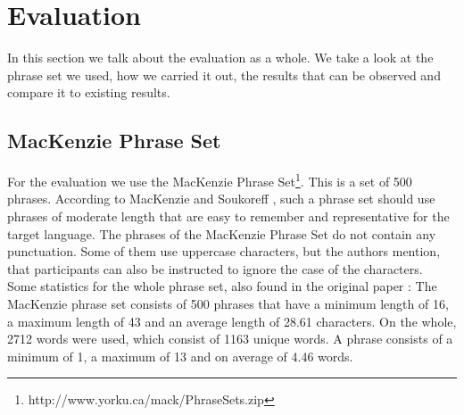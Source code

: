 \chapter{Evaluation}

In this section we talk about the evaluation as a whole. We take a look at the phrase set we used, how we carried it out, the results that can be observed and compare it to existing results.

\section{MacKenzie Phrase Set}
For the evaluation we use the MacKenzie Phrase Set\footnote{http://www.yorku.ca/mack/PhraseSets.zip}. This is a set of 500 phrases. According to MacKenzie and Soukoreff \cite{10.1145/765891.765971}, such a phrase set should use phrases of moderate length that are easy to remember and representative for the target language. The phrases of the MacKenzie Phrase Set do not contain any punctuation. Some of them use uppercase characters, but the authors mention, that participants can also be instructed to ignore the case of the characters.\\
Some statistics for the whole phrase set, also found in the original paper \cite{10.1145/765891.765971}: The MacKenzie phrase set consists of 500 phrases that have a minimum length of 16, a maximum length of 43 and an average length of 28.61 characters. On the whole, 2712 words were used, which consist of 1163 unique words. A phrase consists of a minimum of 1, a maximum of 13 and on average of 4.46 words.

